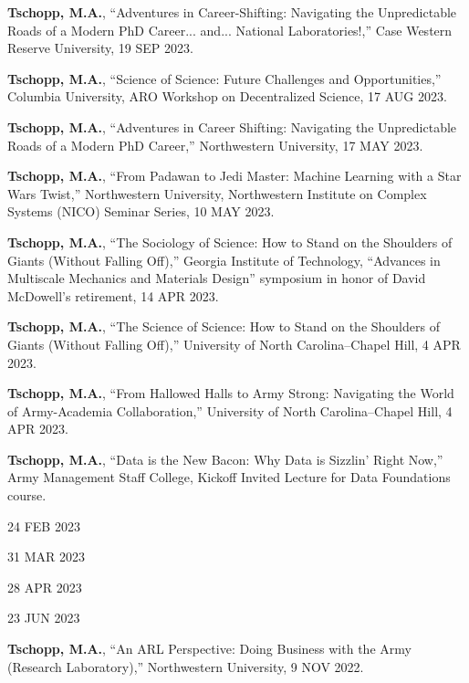 \begin{cvlist}
\item
\textbf{Tschopp, M.A.}, ``Adventures in Career-Shifting: Navigating the Unpredictable Roads of a Modern PhD Career... and... National Laboratories!,'' Case Western Reserve University, 19 SEP 2023.

\item
\textbf{Tschopp, M.A.}, ``Science of Science: Future Challenges and Opportunities,'' Columbia University, ARO Workshop on Decentralized Science, 17 AUG 2023.

\item
\textbf{Tschopp, M.A.}, ``Adventures in Career Shifting: Navigating the Unpredictable Roads of a Modern PhD Career,'' Northwestern University, 17 MAY 2023.

\item
\textbf{Tschopp, M.A.}, ``From Padawan to Jedi Master: Machine Learning with a Star Wars Twist,'' Northwestern University, Northwestern Institute on Complex Systems (NICO) Seminar Series, 10 MAY 2023.

\item
\textbf{Tschopp, M.A.}, ``The Sociology of Science: How to Stand on the Shoulders of Giants (Without Falling Off),'' Georgia Institute of Technology, ``Advances in Multiscale Mechanics and Materials Design'' symposium in honor of David McDowell's retirement, 14 APR 2023.

\item
\textbf{Tschopp, M.A.}, ``The Science of Science: How to Stand on the Shoulders of Giants (Without Falling Off),'' University of North Carolina--Chapel Hill, 4 APR 2023.

\item
\textbf{Tschopp, M.A.}, ``From Hallowed Halls to Army Strong: Navigating the World of Army-Academia Collaboration,'' University of North Carolina--Chapel Hill, 4 APR 2023.

\item
\textbf{Tschopp, M.A.}, ``Data is the New Bacon: Why Data is Sizzlin' Right Now,'' Army Management Staff College, Kickoff Invited Lecture for Data Foundations course.
\begin{list2}
\item[$\star$] 24 FEB 2023
\item[$\star$] 31 MAR 2023
\item[$\star$] 28 APR 2023
\item[$\star$] 23 JUN 2023
\end{list2}

\item
\textbf{Tschopp, M.A.}, ``An ARL Perspective: Doing Business with the Army (Research Laboratory),'' Northwestern University, 9 NOV 2022.


\end{cvlist}
